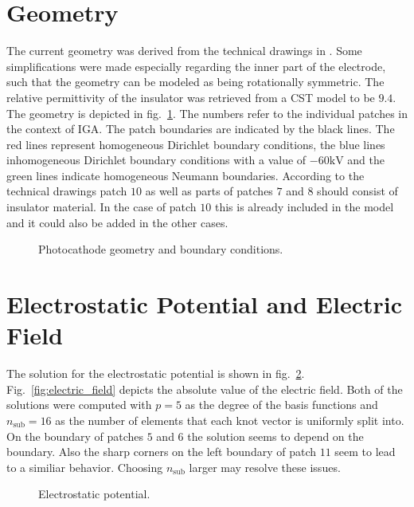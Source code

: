 \section{Geometry}
The current geometry was derived from the technical drawings in \cite{thesis}. Some simplifications were made especially regarding the inner part of the electrode, such that the geometry can be modeled as being rotationally symmetric. The relative permittivity of the insulator was retrieved from a CST model to be $9.4$.
The geometry is depicted in fig.~\ref{fig:geometry}. The numbers refer to the individual patches in the context of IGA. The patch boundaries are indicated by the black lines. The red lines represent homogeneous Dirichlet boundary conditions, the blue lines inhomogeneous Dirichlet boundary conditions with a value of $-60 \mathrm{kV}$ and the green lines indicate homogeneous Neumann boundaries.
According to the technical drawings patch $10$ as well as parts of patches $7$ and $8$ should consist of insulator material. In the case of patch $10$ this is already included in the model and it could also be added in the other cases.

\begin{center}
\begin{figure}[H]
  
  \caption{Photocathode geometry and boundary conditions.}
  \label{fig:geometry}
\end{figure}
\end{center}

\section{Electrostatic Potential and Electric Field}
\label{sec:potential_field}
The solution for the electrostatic potential is shown in fig.~\ref{fig:potential}. Fig.~\ref{fig:electric_field} depicts the absolute value of the electric field.
Both of the solutions were computed with $p=5$ as the degree of the basis functions and $n_\mathrm{sub}=16$ as the number of elements that each knot vector is uniformly split into.
On the boundary of patches $5$ and $6$ the solution seems to depend on the boundary. Also the sharp corners on the left boundary of patch $11$ seem to lead to a similiar behavior. Choosing $n_\mathrm{sub}$ larger may resolve these issues.

\begin{center}
\begin{figure}[H]
  
  \caption{Electrostatic potential.}
  \label{fig:potential}
\end{figure}
\end{center}

